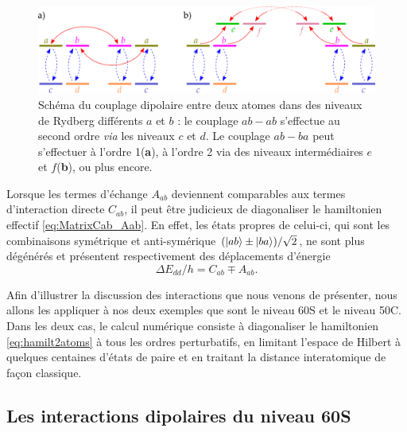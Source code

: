 \begin{figure}[!h]
\centering
\includegraphics[width=0.9\linewidth]{figures/theory/dipole_coupling_abab}
\caption[Couplage dipolaire entre niveaux de Rydberg différents]{Schéma du couplage dipolaire entre deux atomes dans des niveaux de Rydberg différents $a$ et $b$ : le couplage $ab-ab$ s'effectue au second ordre \textit{via} les niveaux $c$ et $d$. Le couplage $ab-ba$ peut s'effectuer à l'ordre 1(\textbf{a}), à l'ordre 2 via des niveaux intermédiaires $e$ et $f$(\textbf{b}), ou plus encore.}
\label{fig:Dip_abab}
\end{figure}


Lorsque les termes d'échange $A_{ab}$ deviennent comparables aux termes d'interaction directe $C_{ab}$, il peut être judicieux de diagonaliser le hamiltonien effectif \eqref{eq:MatrixCab_Aab}.
En effet, les états propres de celui-ci, qui sont les combinaisons symétrique et anti-symérique $(\ket{ab}\pm \ket{ba})/\sqrt{2}$, ne sont plus dégénérés et présentent respectivement des déplacements d'énergie
\begin{equation}
\label{eq:shift_abab}
\Delta E_{dd} /h = C_{ab} \mp A_{ab}.
\end{equation}

Afin d'illustrer la discussion des interactions que nous venons de présenter, nous allons les appliquer à nos deux exemples que sont le niveau 60S et le niveau 50C.
Dans les deux cas, le calcul numérique consiste à diagonaliser le hamiltonien \eqref{eq:hamilt2atoms} à tous les ordres perturbatifs, en limitant l'espace de Hilbert à quelques centaines d'états de paire et en traitant la distance interatomique de façon classique.

\subsection{Les interactions dipolaires du niveau 60S}

